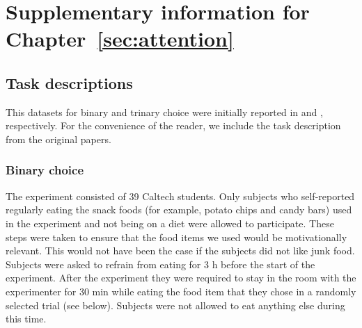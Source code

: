 
\clearpage


\newcommand{\nextbest}{\max_{i \neq c} \mu_t^{(i)}}
\newcommand{\postmean}{\mu_{t+1}^{(c)}}
\newcommand{\currentmean}{\mu_{t}^{(c)}}
\newcommand{\currentlam}{\lambda_{t}^{(c)}}
\newcommand{\voiCDF}{\Phi \left( \frac{a - \mu_\mu}{\sigma_\mu} \right)}
\newcommand{\conditionalx}{x_t \mid \currentmean, \currentlam}


\chapter{Supplementary information for Chapter~\ref{sec:attention}}

\section{Task descriptions}\label{app:attention-task}

This datasets for binary and trinary choice were initially reported in \citet{krajbich2010visual} and \citet{krajbich2011multialternative}, respectively. For the convenience of the reader, we include the task description from the original papers.

\subsection{Binary choice}

The experiment consisted of 39 Caltech students. Only subjects who self-reported regularly eating the snack foods (for example, potato chips and candy bars) used in the experiment and not being on a diet were allowed to participate. These steps were taken to ensure that the food items we used would be motivationally relevant. This would not have been the case if the subjects did not like junk food. Subjects were asked to refrain from eating for 3 h before the start of the experiment. After the experiment they were required to stay in the room with the experimenter for 30 min while eating the food item that they chose in a randomly selected trial (see below). Subjects were not allowed to eat anything else during this time.

